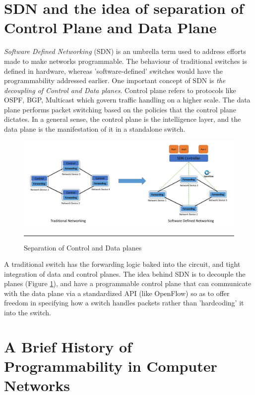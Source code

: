 \section{SDN and the idea of separation of Control Plane and Data Plane}
\emph{Software Defined Networking} (SDN) is an umbrella term used to address efforts made to make networks programmable. The behaviour of
traditional switches is defined in hardware, whereas 'software-defined' switches would have the programmability addressed
earlier. One important concept of SDN is \textit{the decoupling of Control and Data planes}.
Control plane refers to protocols like OSPF, BGP, Multicast which govern traffic handling on a higher scale. The 
data plane performs packet switching based on the policies that the control plane dictates. In a general sense, the control
plane is the intelligence layer, and the data plane is the manifestation of it in a standalone switch.
\begin{figure}[ht]
	\centering
		\includegraphics[width=1.0\columnwidth]{Figures/control_data_sep.png}
		\rule{35em}{0.5pt}
	\caption[Separation of Control and Data planes]{Separation of Control and Data planes}
	\label{fig:control_data_sep}
\end{figure}
\newline
A traditional switch has the forwarding logic baked into the circuit, and tight integration of data and control planes.
The idea behind SDN is to decouple the planes (Figure \ref{fig:control_data_sep}), and have a programmable control plane that can communicate with the data plane
via a standardized API (like OpenFlow\cite{openflow}) so as to offer freedom in specifying how a switch handles packets rather than 'hardcoding'
it into the switch.



\section{A Brief History of Programmability in Computer Networks}
